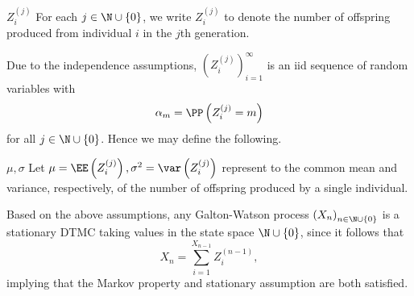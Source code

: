 \documentclass[stat333]{subfiles}
\begin{document}
    \begin{notation}{$Z_i^{\left( j \right)}$}{}
        For each $j\in\N\cup\left\lbrace 0 \right\rbrace$, we write $Z_i^{\left( j \right)}$ to denote the number of offspring produced from individual $i$ in the $j$th generation.
    \end{notation}

    \noindent Due to the independence assumptions, $\left( Z^{\left( j \right)}_{i} \right)^{\infty}_{i=1}$ is an iid sequence of random variables with
    \begin{equation*}
        \alpha_m = \PP\left( Z^{\left( j \right)}_i = m \right)
    \end{equation*}
    for all $j\in\N\cup\left\lbrace 0 \right\rbrace$. Hence we may define the following.

    \begin{notation}{$\mu,\sigma$}{}
        Let $\mu = \EE\left( Z_i^{\left( j \right)} \right), \sigma^{2}=\var\left( Z_i^{\left( j \right)} \right)$ represent to the common mean and variance, respectively, of the number of offspring produced by a single individual.
    \end{notation}

    \noindent Based on the above assumptions, any Galton-Watson process $\left( X_{n} \right)^{}_{n\in\N\cup\left\lbrace 0 \right\rbrace}$ is a stationary DTMC taking values in the state space $\N\cup\left\lbrace 0 \right\rbrace$, since it follows that
    \begin{equation}
        X_n = \sum^{X_{n-1}}_{i=1} Z_i^{\left( n-1 \right)},
    \end{equation}
    implying that the Markov property and stationary assumption are both satisfied. 
\end{document}
